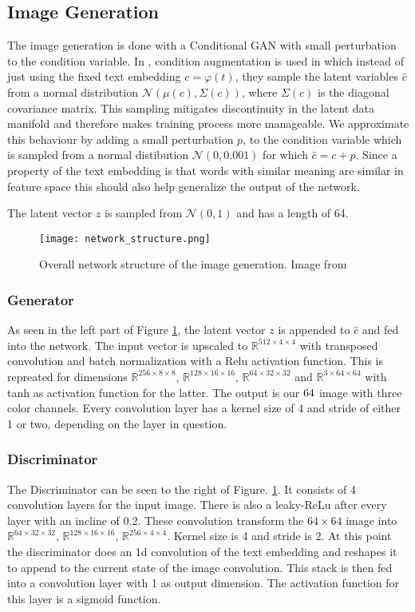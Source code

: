 \documentclass[../main.tex]{subfiles}
\begin{document}
\subsection{Image Generation}
The image generation is done with a Conditional GAN \cite{mirza2014conditionalgan} with small perturbation to the condition variable. In \cite{zhang2017stackgan}, condition augmentation is used in which instead of just using the fixed text embedding $c = \varphi(t)$, they sample the latent variables $\hat{c}$ from a normal distribution $\mathcal{N}(\mu (c),\Sigma (c))$, where $\Sigma (c)$ is the diagonal covariance matrix. This sampling mitigates discontinuity in the latent data manifold and therefore makes training process more manageable. We approximate this behaviour by adding a small perturbation $p$, to the condition variable which is sampled from a normal distibution $\mathcal{N}(0,0.001)$ for which $\hat{c} = c + p$. Since a property of the text embedding is that words with similar meaning are similar in feature space this should also help generalize the output of the network.

The latent vector $z$ is sampled from $\mathcal{N}(0,1)$ and has a length of 64. 
\begin{figure}[h]
    \centering
    \texttt{[image: network\_structure.png]}
    \caption{Overall network structure of the image generation. Image from \cite{reed2016generative}}
    \label{fig:overall_structure}
\end{figure}
\subsubsection{Generator}
As seen in the left part of Figure \ref{fig:overall_structure}, the latent vector $z$ is appended to $\hat{c}$ and fed into the network. The input vector is upscaled to $\mathbb{R}^{512 \times 4 \times 4}$ with transposed convolution and batch normalization with a Relu activation function. This is repreated for dimensions $\mathbb{R}^{256 \times 8 \times 8}$, $\mathbb{R}^{128 \times 16 \times 16}$, $\mathbb{R}^{64 \times 32 \times 32}$ and $\mathbb{R}^{3 \times 64 \times 64}$ with tanh as activation function for the latter. The output is our $64 \time 64$ image with three color channels. Every convolution layer has a kernel size of 4 and stride of either 1 or two, depending on the layer in question.
\subsubsection{Discriminator}
The Discriminator can be seen to the right of Figure. \ref{fig:overall_structure}. It consists of 4 convolution layers for the input image. There is also a leaky-ReLu after every layer with an incline of 0.2. These convolution transform the $64 \times 64$ image into $\mathbb{R}^{64 \times 32 \times 32}$, $\mathbb{R}^{128 \times 16 \times 16}$, $\mathbb{R}^{256 \times 4 \times 4}$. Kernel size is 4 and stride is 2. 
At this point the discriminator does an 1d convolution of the text embedding and reshapes it to append to the current state of the image convolution. This stack is then fed into a convolution layer with 1 as output dimension. The activation function for this layer is a sigmoid function. 
\end{document}
